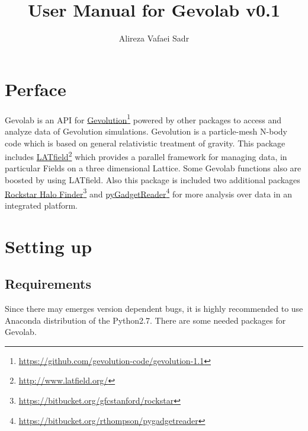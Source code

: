 \documentclass[a4paper, 12 pt]{article}
\title{User Manual for Gevolab v0.1}
\author{Alireza Vafaei Sadr}
\newcommand\fnurl[2]{%
  \href{#2}{#1}\footnote{\url{#2}}%
}
\begin{document}
\maketitle
\tableofcontents
\newpage


\section{Perface}
Gevolab is an API for \fnurl{Gevolution}{https://github.com/gevolution-code/gevolution-1.1}\cite{Adamek:2016zes} powered by other packages to access and analyze data of Gevolution simulations.
Gevolution is a particle-mesh N-body code which is based on general relativistic treatment of gravity. This package includes \fnurl{LATfield}{http://www.latfield.org/}\cite{David:2015eya} which provides a parallel framework for managing data, in particular Fields on a three dimensional Lattice. Some Gevolab functions also are boosted by using LATfield. Also this package is included two additional packages \fnurl{Rockstar Halo Finder}{https://bitbucket.org/gfcstanford/rockstar}\cite{Behroozi:2011ju} and \fnurl{pyGadgetReader}{https://bitbucket.org/rthompson/pygadgetreader}\cite{thompson:2014} for more analysis over data in an integrated platform.


\section{Setting up}


\subsection{Requirements}
Since there may emerges version dependent bugs, it is highly recommended to use Anaconda distribution of the Python2.7. There are some needed packages for Gevolab.
\end{document}
